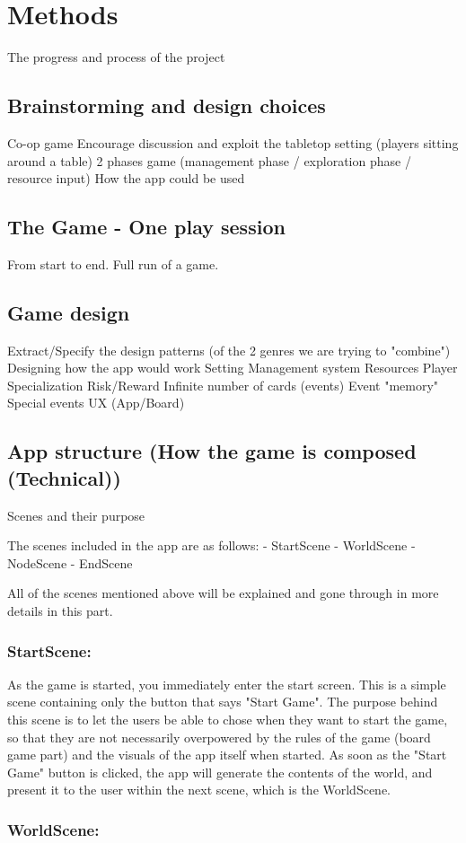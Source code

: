 \section{Methods}
The progress and process of the project
\subsection{Brainstorming and design choices}
Co-op game 
Encourage discussion and exploit the tabletop setting (players sitting around a table)
2 phases game (management phase / exploration phase / resource input)
How the app could be used
\subsection{The Game - One play session}
From start to end. Full run of a game.
\subsection{Game design}
Extract/Specify the design patterns (of the 2 genres we are trying to "combine")
Designing how the app would work
Setting
Management system
Resources
Player Specialization
Risk/Reward
Infinite number of cards (events)
Event "memory"
Special events
UX (App/Board)
\subsection{App structure (How the game is composed (Technical))}
Scenes and their purpose

The scenes included in the app are as follows:
- StartScene
- WorldScene
- NodeScene
- EndScene

All of the scenes mentioned above will be explained and gone through in more details in this part.
\subsubsection{StartScene:}
As the game is started, you immediately enter the start screen. This is a simple scene containing only the button that says "Start Game". The purpose behind this scene is to let the users be able to chose when they want to start the game, so that they are not necessarily overpowered by the rules of the game (board game part) and the visuals of the app itself when started.
As soon as the "Start Game" button is clicked, the app will generate the contents of the world, and present it to the user within the next scene, which is the WorldScene.
\subsubsection{WorldScene:}

